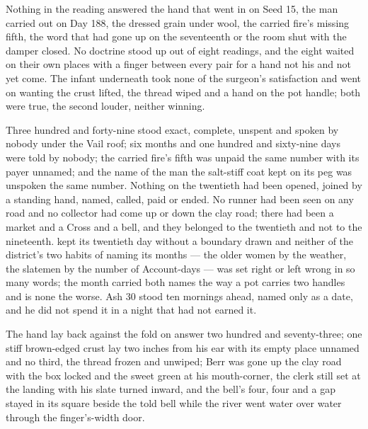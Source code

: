 Nothing in the reading answered the hand that went in on Seed 15, the man carried out on Day 188, the dressed grain under wool, the carried fire's missing fifth, the word that had gone up  on the seventeenth or the room shut with the damper closed. No doctrine stood up out of eight readings, and the eight waited on their own places with a finger between every pair for a hand not his and not yet come. The infant underneath took none of the surgeon's satisfaction and went on wanting the crust lifted, the thread wiped and a hand on the pot handle; both were true, the second louder, neither winning.

Three hundred and forty-nine stood exact, complete, unspent and spoken by nobody under the Vail roof; six months and one hundred and sixty-nine days were told by nobody; the carried fire's fifth was unpaid the same number with its payer unnamed; and the name of the man the salt-stiff coat kept on its peg was unspoken the same number. Nothing on the twentieth had been opened, joined by a standing hand, named, called, paid or ended. No runner had been seen on any road and no collector had come up or down the clay road; there had been a market and a Cross and a bell, and they belonged to the twentieth and not to the nineteenth.  kept its twentieth day without a boundary drawn and neither of the district's two habits of naming its months --- the older women by the weather, the slatemen by the number of Account-days --- was set right or left wrong in so many words; the month carried both names the way a pot carries two handles and is none the worse. Ash 30 stood ten mornings ahead, named only as a date, and he did not spend it in a night that had not earned it.

The hand lay back against the fold on answer two hundred and seventy-three; one stiff brown-edged crust lay two inches from his ear with its empty place unnamed and no third, the thread frozen and unwiped; Berr was gone up the clay road with the box locked and the sweet green at his mouth-corner, the clerk still set at the landing with his slate turned inward, and the bell's four, four and a gap stayed in its square beside the told bell while the river went water over water through the finger's-width door.
